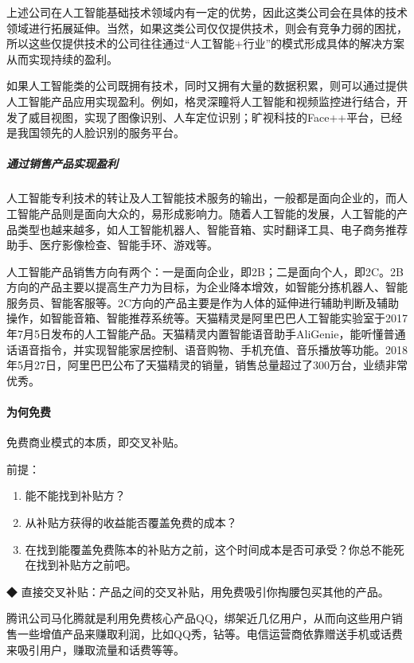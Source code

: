 \documentclass[letterpaper,11pt,english]{sphinxmanual}
\begin{document}
上述公司在人工智能基础技术领域内有一定的优势，因此这类公司会在具体的技术领域进行拓展延伸。当然，如果这类公司仅仅提供技术，则会有竞争力弱的困扰，所以这些仅提供技术的公司往往通过“人工智能+行业”的模式形成具体的解决方案从而实现持续的盈利。

如果人工智能类的公司既拥有技术，同时又拥有大量的数据积累，则可以通过提供人工智能产品应用实现盈利。例如，格灵深瞳将人工智能和视频监控进行结合，开发了威目视图，实现了图像识别、人车定位识别；旷视科技的Face++平台，已经是我国领先的人脸识别的服务平台。


\subparagraph{通过销售产品实现盈利}
\label{\detokenize{chapter_introduction/money:id24}}
人工智能专利技术的转让及人工智能技术服务的输出，一般都是面向企业的，而人工智能产品则是面向大众的，易形成影响力。随着人工智能的发展，人工智能的产品类型也越来越多，如人工智能机器人、智能音箱、实时翻译工具、电子商务推荐助手、医疗影像检查、智能手环、游戏等。

人工智能产品销售方向有两个：一是面向企业，即2B；二是面向个人，即2C。2B方向的产品主要以提高生产力为目标，为企业降本增效，如智能分拣机器人、智能服务员、智能客服等。2C方向的产品主要是作为人体的延伸进行辅助判断及辅助操作，如智能音箱、智能推荐系统等。天猫精灵是阿里巴巴人工智能实验室于2017年7月5日发布的人工智能产品。天猫精灵内置智能语音助手AliGenie，能听懂普通话语音指令，并实现智能家居控制、语音购物、手机充值、音乐播放等功能。2018年5月27日，阿里巴巴公布了天猫精灵的销量，销售总量超过了300万台，业绩非常优秀。


\paragraph{为何免费}
\label{\detokenize{chapter_introduction/money:id25}}
免费商业模式的本质，即交叉补贴。

前提：
\begin{enumerate}
%
\item {} 
能不能找到补贴方？

\item {} 
从补贴方获得的收益能否覆盖免费的成本？

\item {} 
在找到能覆盖免费陈本的补贴方之前，这个时间成本是否可承受？你总不能死在找到补贴方之前吧。

\end{enumerate}

◆ 直接交叉补贴：产品之间的交叉补贴，用免费吸引你掏腰包买其他的产品。

腾讯公司马化腾就是利用免费核心产品QQ，绑架近几亿用户，从而向这些用户销售一些增值产品来赚取利润，比如QQ秀，钻等。电信运营商依靠赠送手机或话费来吸引用户，赚取流量和话费等等。
\end{document}
